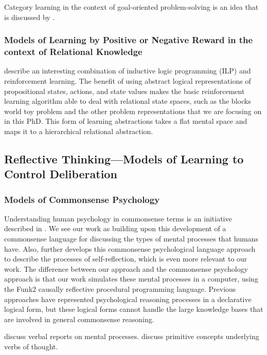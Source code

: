 Category learning in the context of goal-oriented problem-solving is an idea that is discussed by \cite{barsalou:1995}.

\subsubsection{Models of Learning by Positive or Negative Reward in the context of Relational Knowledge}

\cite{dvzeroski:2001} describe an interesting combination of inductive logic programming (ILP) \cite[]{muggleton:1992} and reinforcement learning.
The benefit of using abstract logical representations of propositional states, actions, and state values makes the basic reinforcement learning algorithm able to deal with relational state spaces, such as the blocks world toy problem and the other problem representations that we are focusing on in this PhD.
This form of learning abstractions takes a flat mental space and maps it to a hierarchical relational abstraction.

\subsection{Reflective Thinking---Models of Learning to Control Deliberation}

\subsubsection{Models of Commonsense Psychology}

Understanding human psychology in commonsense terms is an initiative described in \cite{gordon:2004}.
We see our work as building upon this development of a commonsense language for discussing the types of mental processes that humans have.
Also, \cite{gordon:2008} further develops this commonsense psychological language approach to describe the processes of self-reflection, which is even more relevant to our work.
The difference between our approach and the commonsense psychology approach is that our work simulates these mental processes in a computer, using the Funk2 causally reflective procedural programming language.
Previous approaches have represented psychological reasoning processes in a declarative logical form, but these logical forms cannot handle the large knowledge bases that are involved in general commonsense reasoning.

\cite{wilson:1977} discuss verbal reports on mental processes.
\cite{schank:1972} discuss primitive concepts underlying verbs of thought.

